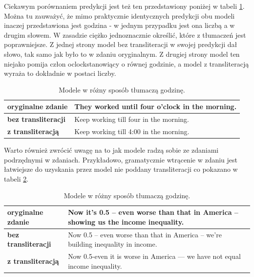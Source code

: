 \documentclass[
    left=2.5cm,         %
    right=2.5cm,        %
    top=2.5cm,          %
    bottom=3cm,         %
    bindingoffset=6mm,  %
    nohyphenation=false %
]{eiti/eiti-report}
\begin{document}
Ciekawym porównaniem predykcji jest też ten przedstawiony poniżej w tabeli \ref{tab:numeral_table}. Można tu zauważyć, że mimo praktycznie identycznych predykcji obu modeli inaczej przedstawiona jest godzina - w jednym przypadku jest ona liczbą a w drugim słowem. W zasadzie ciężko jednoznacznie określić, które z tłumaczeń jest poprawniejsze. Z jednej strony model bez transliteracji w swojej predykcji dał słowo, tak samo jak było to w zdaniu oryginalnym. Z drugiej strony model ten niejako pomija człon \textquotesingle \textquotesingle o\textquotesingle clock\textquotesingle\textquotesingle  stanowiący o równej godzinie, a model z transliteracją wyraża to dokładnie w postaci liczby.
\begin{table}[H]
\centering
\footnotesize
\begin{tabular}{ |p{4cm}|p{10cm}|  }
    \hline
    \textbf{oryginalne zdanie} & They worked until four o'clock in the morning.\\
     \hline
     \textbf{bez transliteracji} & Keep working till four in the morning. \\
     \hline
     \textbf{z transliteracją} & Keep working till 4:00 in the morning. \\
     \hline
\end{tabular}
\caption{Modele w różny sposób tłumaczą godzinę.}
\label{tab:numeral_table}
\end{table}

Warto również zwrócić uwagę na to jak modele radzą sobie ze zdaniami podrzędnymi w zdaniach. Przykładowo, gramatycznie wtrącenie w zdaniu jest łatwiejsze do uzyskania przez model nie poddany transliteracji co pokazano w tabeli \ref{tab:insertion}.
\begin{table}[H]
\centering
\footnotesize
\begin{tabular}{ |p{4cm}|p{10cm}|  }
    \hline
    \textbf{oryginalne zdanie} & Now it's 0.5 -- even worse than that in America -- showing us the income inequality.\\
     \hline
     \textbf{bez transliteracji} & Now 0.5 – even worse than that in America -- we're building inequality in income. \\
     \hline
     \textbf{z transliteracją} &  Now 0.5-even it is worse in America — we have not equal income inequality. \\
     \hline
\end{tabular}
\caption{Modele w różny sposób tłumaczą godzinę.}
\label{tab:insertion}
\end{table}
\end{document}
